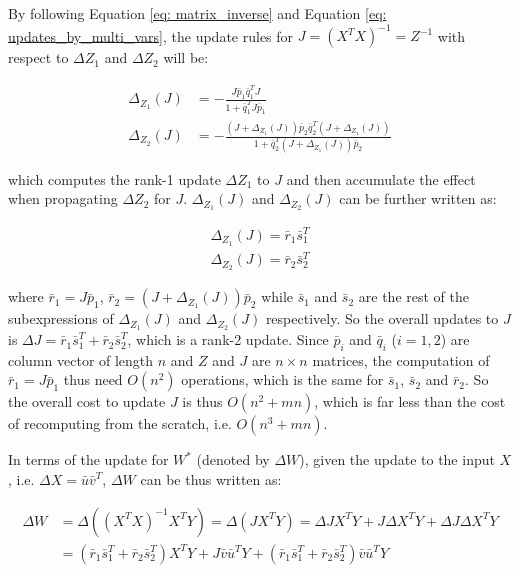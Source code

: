 By following Equation \ref{eq: matrix_inverse} and Equation \ref{eq: updates_by_multi_vars}, the update rules for $J = (X^TX)^{-1} = Z^{-1}$ with respect to $\Delta Z_1$ and $\Delta Z_2$ will be:

\begin{center}
\begin{equation}
\begin{split}
    \Delta_{Z_1}(J)& = -\frac{J\bar{p}_1\bar{q}_1^TJ}{1 + \bar{q}_1^TJ\bar{p}_1}\\
    \Delta_{Z_2}(J)& = -\frac{(J+\Delta_{Z_1}(J))\bar{p}_2\bar{q}_2^T(J+\Delta_{Z_1}(J))}{1 + \bar{q}_2^T(J+\Delta_{Z_1}(J))\bar{p}_2}
\end{split}   
\end{equation}
\end{center}

which computes the rank-1 update $\Delta Z_1$ to $J$ and then accumulate the effect when propagating $\Delta Z_2$ for $J$. $\Delta_{Z_1}(J)$ and $\Delta_{Z_2}(J)$ can be further written as:

\begin{equation}
\begin{split}
\Delta_{Z_1}(J) = \bar{r}_1\bar{s}_1^T\\    
\Delta_{Z_2}(J) = \bar{r}_2\bar{s}_2^T
\end{split}
\end{equation}

where $\bar{r}_1 = J\bar{p}_1$, $\bar{r}_2 = (J+\Delta_{Z_1}(J))\bar{p}_2$ while $\bar{s}_1$ and $\bar{s}_2$ are the rest of the subexpressions of $\Delta_{Z_1}(J)$ and $\Delta_{Z_2}(J)$ respectively. So the overall updates to $J$ is $\Delta J = \bar{r}_1\bar{s}_1^T + \bar{r}_2\bar{s}_2^T$, which is a rank-2 update.
Since $\bar{p}_i$ and $\bar{q}_i$ ($i=1,2$) are column vector of length $n$ and $Z$ and $J$ are $n \times n$ matrices, the computation of $\bar{r}_1 =J\bar{p}_1$ thus need $O(n^2)$ operations, which is the same for $\bar{s}_1$, $\bar{s}_2$ and $\bar{r}_2$. So the overall cost to update $J$ is thus $O(n^2 + mn)$, which is far less than the cost of recomputing from the scratch, i.e. $O(n^3 + mn)$.

In terms of the update for $W^*$ (denoted by $\Delta W$), given the update to the input $X$, i.e. $\Delta X=\bar{u}\bar{v}^T$, $\Delta W$ can be thus written as:

\begin{equation}
\begin{split}
    \Delta W &= \Delta ((X^TX)^{-1}X^TY) = \Delta(JX^TY)= \Delta JX^TY + J\Delta X^TY + \Delta J\Delta X^TY\\
    &= (\bar{r}_1\bar{s}_1^T + \bar{r}_2\bar{s}_2^T)X^TY + J\bar{v}\bar{u}^TY + (\bar{r}_1\bar{s}_1^T + \bar{r}_2\bar{s}_2^T)\bar{v}\bar{u}^TY
\end{split}
\end{equation}

